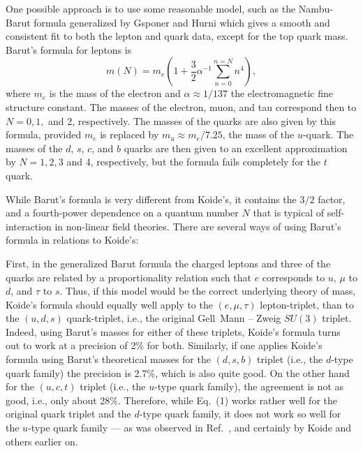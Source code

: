 \documentclass[12pt,a4paper]{article}
\begin{document}
   One possible approach is to use some reasonable model, such as the Nambu-Barut \cite{alfa2,barut} formula generalized by Gsponer and Hurni \cite{gh1995} which gives a smooth and consistent fit to both the lepton and quark data, except for the top quark mass.  Barut's formula for leptons is 
%
\begin{equation}
  m(N)= m_e (1 + \frac{3}{2} \alpha^{-1} \sum_{n=0}^{n=N} n^4 ),
\end{equation}
%
where $m_e$ is the mass of the electron and $\alpha \approx 1/137$ the electromagnetic fine structure constant. The masses of the electron, muon, and tau correspond then to $N=0,1,$ and 2, respectively.  The masses of the quarks are also given by this formula, provided $m_e$ is replaced by $m_u  \approx m_e/7.25$, the mass of the $u$-quark. The masses of the $d$, $s$, $c$, and $b$ quarks are then given to an excellent approximation by $N=1,2,3$ and 4, respectively, but the formula fails completely for the $t$ quark.

   While Barut's formula is very different from Koide's, it contains the $3/2$ factor, and a fourth-power dependence on a quantum number $N$ that is typical of self-interaction in non-linear field theories.
There are several ways of using Barut's formula in relations to Koide's:

First, in the generalized Barut formula the charged leptons and three of the quarks are related by a proportionality relation such that $e$ corresponds to $u$, $\mu$ to $d$, and $\tau$ to $s$.  Thus, if this model would be the correct underlying theory of mass, Koide's formula should equally well apply to the $(e,\mu,\tau)$ lepton-triplet, than to the $(u,d,s)$ quark-triplet, i.e., the original Gell~Mann -- Zweig $SU(3)$ triplet.  Indeed, using Barut's masses for either of these triplets, Koide's formula turns out to work at a precision of 2\% for both.  Similarly, if one applies Koide's formula using Barut's theoretical masses for the $(d,s,b)$ triplet (i.e., the $d$-type quark family) the precision is 2.7\%, which is also quite good.  On the other hand for the $(u,c,t)$ triplet (i.e., the $u$-type quark family), the agreement is not as good, i.e., only about 28\%.  Therefore, while Eq.~(1) works rather well for the original quark triplet and the $d$-type quark family, it does not work so well for the $u$-type quark family --- as was observed in Ref.~\cite{newone}, and certainly by Koide and others earlier on.  
\end{document}
